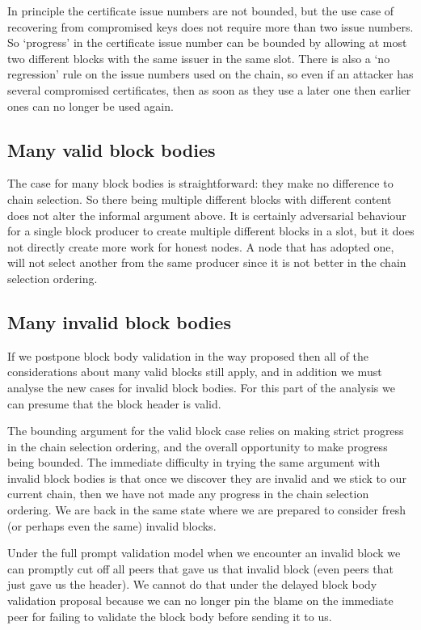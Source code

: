 \documentclass[11pt,a4paper]{article}
\begin{document}
In principle the certificate issue numbers are not bounded, but the use case
of recovering from compromised keys does not require more than two issue
numbers. So `progress' in the certificate issue number can be bounded by
allowing at most two different blocks with the same issuer in the same slot.
There is also a `no regression' rule on the issue numbers used on the chain, so
even if an attacker has several compromised certificates, then as soon as they
use a later one then earlier ones can no longer be used again.

\subsection{Many valid block bodies}

The case for many block bodies is straightforward: they make no difference to
chain selection. So there being multiple different blocks with different
content does not alter the informal argument above. It is certainly adversarial
behaviour for a single block producer to create multiple different blocks in a
slot, but it does not directly create more work for honest nodes. A node that
has adopted one, will not select another from the same producer since it is not
better in the chain selection ordering.

\subsection{Many invalid block bodies}

If we postpone block body validation in the way proposed then all of the
considerations about many valid blocks still apply, and in addition we must
analyse the new cases for invalid block bodies. For this part of the analysis
we can presume that the block header is valid.

The bounding argument for the valid block case relies on making strict
progress in the chain selection ordering, and the overall opportunity to make
progress being bounded. The immediate difficulty in trying the same argument
with invalid block bodies is that once we discover they are invalid and we
stick to our current chain, then we have not made any progress in the chain
selection ordering. We are back in the same state where we are prepared to
consider fresh (or perhaps even the same) invalid blocks.

Under the full prompt validation model when we encounter an invalid block we
can promptly cut off all peers that gave us that invalid block (even peers
that just gave us the header). We cannot do that under the delayed block body
validation proposal because we can no longer pin the blame on the immediate
peer for failing to validate the block body before sending it to us.
\end{document}
